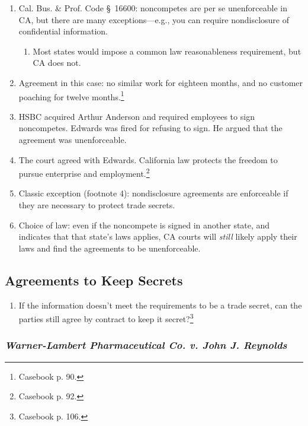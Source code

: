 
\begin{enumerate}
    \item Cal. Bus. \& Prof. Code \S\ 16600: noncompetes are per se 
    unenforceable in CA, but there are many exceptions---e.g., you can require 
    nondisclosure of confidential information.
    \begin{enumerate}
        \item Most states would impose a common law reasonableness 
        requirement, but CA does not.
    \end{enumerate}
    \item Agreement in this case: no similar work for eighteen months, and no 
    customer poaching for twelve months.\footnote{Casebook p. 90.}
    \item HSBC acquired Arthur Anderson and required employees to sign 
    noncompetes. Edwards was fired for refusing to sign. He argued that the 
    agreement was unenforceable.
    \item The court agreed with Edwards. California law protects the freedom 
    to pursue enterprise and employment.\footnote{Casebook p. 92.}
    \item Classic exception (footnote 4): nondisclosure agreements are 
    enforceable if they are necessary to protect trade secrets.
    \item Choice of law: even if the noncompete is signed in another state, 
    and indicates that that state's laws applies, CA courts will \emph{still} 
    likely apply their laws and find the agreements to be unenforceable.
\end{enumerate}

\newpage %

\subsection{Agreements to Keep Secrets}

\begin{enumerate}
    \item If the information doesn't meet the requirements to be a trade 
    secret, can the parties still agree by contract to keep it 
    secret?\footnote{Casebook p. 106.}
\end{enumerate}

\subsubsection{\emph{Warner-Lambert Pharmaceutical Co. v. John J. Reynolds}}

